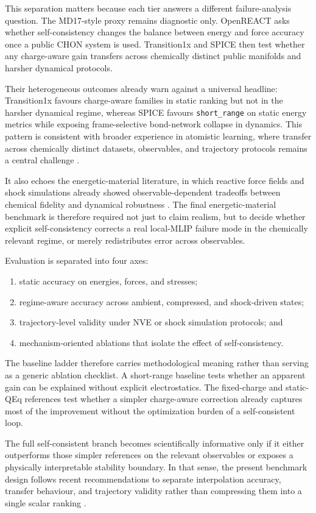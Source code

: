 This separation matters because each tier answers a different failure-analysis question. The MD17-style proxy remains diagnostic only. OpenREACT asks whether self-consistency changes the balance between energy and force accuracy once a public CHON system is used. Transition1x and SPICE then test whether any charge-aware gain transfers across chemically distinct public manifolds and harsher dynamical protocols.

Their heterogeneous outcomes already warn against a universal headline: Transition1x favours charge-aware families in static ranking but not in the harsher dynamical regime, whereas SPICE favours \texttt{short\_range} on static energy metrics while exposing frame-selective bond-network collapse in dynamics. This pattern is consistent with broader experience in atomistic learning, where transfer across chemically distinct datasets, observables, and trajectory protocols remains a central challenge \cite{musil2021physics,artrith2021machine,fu2023forces,goedecker2023perspective,chen2024universal,jacobs2025practical,ko2025dataefficient}.

It also echoes the energetic-material literature, in which reactive force fields and shock simulations already showed observable-dependent tradeoffs between chemical fidelity and dynamical robustness \cite{van2001reaxff,bolton2008molecular,menikoff2016shock}. The final energetic-material benchmark is therefore required not just to claim realism, but to decide whether explicit self-consistency corrects a real local-MLIP failure mode in the chemically relevant regime, or merely redistributes error across observables.

Evaluation is separated into four axes:
\begin{enumerate}
    \item static accuracy on energies, forces, and stresses;
    \item regime-aware accuracy across ambient, compressed, and shock-driven states;
    \item trajectory-level validity under NVE or shock simulation protocols; and
    \item mechanism-oriented ablations that isolate the effect of self-consistency.
\end{enumerate}

The baseline ladder therefore carries methodological meaning rather than serving as a generic ablation checklist. A short-range baseline tests whether an apparent gain can be explained without explicit electrostatics. The fixed-charge and static-QEq references test whether a simpler charge-aware correction already captures most of the improvement without the optimization burden of a self-consistent loop.

The full self-consistent branch becomes scientifically informative only if it either outperforms those simpler references on the relevant observables or exposes a physically interpretable stability boundary. In that sense, the present benchmark design follows recent recommendations to separate interpolation accuracy, transfer behaviour, and trajectory validity rather than compressing them into a single scalar ranking \cite{deringer2021gaussian,goedecker2023perspective,fu2023forces,chen2024universal,huang2025cross}.
